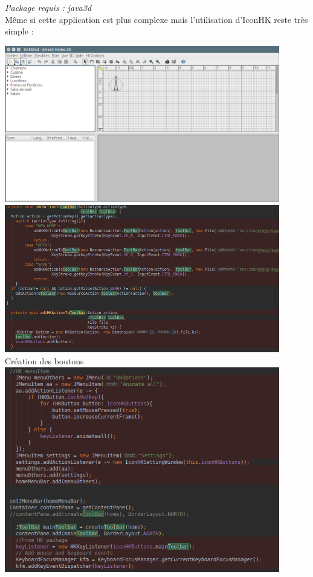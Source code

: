 \documentclass[12pt,a4paper]{article}
\begin{document}
\begin{enumerate}
\textit{Package requis : java3d}\\
Même si cette application est plus complexe mais l'utilisation d'IconHK reste très simple :
\begin{center}
	\includegraphics[width=0.9\textwidth]{08.png}\\
	\includegraphics[width=0.9\textwidth]{10.png}\\
	Création des boutons\\
	\includegraphics[width=0.9\textwidth]{09.png}\\

\end{center}
\end{enumerate}
\end{document}

